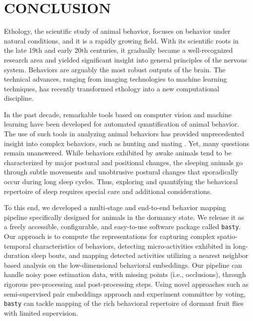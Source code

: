 \setlength{\parindent}{0pt}
\chapter{\bf CONCLUSION}\label{chapter:conclusion}

Ethology, the scientific study of animal behavior, focuses on behavior under natural conditions, and it is a rapidly growing field. With its scientific roots in the late 19th and early 20th centuries, it gradually became a well-recognized research area and yielded significant insight into general principles of the nervous system.
Behaviors are arguably the most robust outputs of the brain. The technical advances, ranging from imaging technologies to machine learning techniques, has recently transformed ethology into a new computational discipline.


In the past decade, remarkable tools based on computer vision and machine learning have been developed for automated quantification of animal behavior.
The use of such tools in analyzing animal behaviors has provided unprecedented insight into complex behaviors, such as hunting and mating \citep{mearns_deconstructing_2020, janisch_deciphering_2021}.
Yet, many questions remain unanswered.
While behaviors exhibited by awake animals tend to be characterized by major postural and positional changes, the sleeping animals go through subtle movements and unobtrusive postural changes that sporadically  occur during long sleep cycles.
Thus, exploring and quantifying the behavioral repertoire of sleep requires special care and additional considerations.

To this end, we developed a multi-stage and end-to-end behavior mapping pipeline specifically designed for animals in the dormancy state. We release it as a freely accessible, configurable, and easy-to-use software package called \texttt{basty}.
Our approach is to compute the representations for capturing complex spatio-temporal characteristics of behaviors, detecting micro-activities exhibited in long-duration sleep bouts, and mapping detected activities utilizing a nearest neighbor based analysis on the low-dimensional behavioral embeddings.
Our pipeline can handle noisy pose estimation data, with missing points (i.e., occlusions), through rigorous pre-processing and post-processing steps.
Using novel approaches such as semi-supervised pair embeddings approach and experiment committee by voting, \texttt{basty} can tackle mapping of the rich behavioral repertoire of dormant fruit flies with limited supervision.

